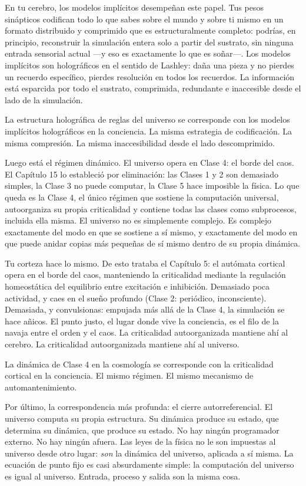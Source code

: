 \documentclass[11pt, twoside, openright]{book}
\begin{document}
En tu cerebro, los modelos implícitos desempeñan este papel. Tus pesos sinápticos codifican todo lo que sabes sobre el mundo y sobre ti mismo en un formato distribuido y comprimido que es estructuralmente completo: podrías, en principio, reconstruir la simulación entera solo a partir del sustrato, sin ninguna entrada sensorial actual ---y eso es exactamente lo que es soñar---. Los modelos implícitos son holográficos en el sentido de Lashley: daña una pieza y no pierdes un recuerdo específico, pierdes resolución en todos los recuerdos. La información está esparcida por todo el sustrato, comprimida, redundante e inaccesible desde el lado de la simulación.

La estructura holográfica de reglas del universo se corresponde con los modelos implícitos holográficos en la conciencia. La misma estrategia de codificación. La misma compresión. La misma inaccesibilidad desde el lado descomprimido.

Luego está el régimen dinámico. El universo opera en Clase 4: el borde del caos. El Capítulo 15 lo estableció por eliminación: las Clases 1 y 2 son demasiado simples, la Clase 3 no puede computar, la Clase 5 hace imposible la física. Lo que queda es la Clase 4, el único régimen que sostiene la computación universal, autoorganiza su propia criticalidad y contiene todas las clases como subprocesos, incluida ella misma. El universo no es simplemente complejo. Es complejo exactamente del modo en que se sostiene a sí mismo, y exactamente del modo en que puede anidar copias más pequeñas de sí mismo dentro de su propia dinámica.

Tu corteza hace lo mismo. De esto trataba el Capítulo 5: el autómata cortical opera en el borde del caos, manteniendo la criticalidad mediante la regulación homeostática del equilibrio entre excitación e inhibición. Demasiado poca actividad, y caes en el sueño profundo (Clase 2: periódico, inconsciente). Demasiada, y convulsionas: empujada más allá de la Clase 4, la simulación se hace añicos. El punto justo, el lugar donde vive la conciencia, es el filo de la navaja entre el orden y el caos. La criticalidad autoorganizada mantiene ahí al cerebro. La criticalidad autoorganizada mantiene ahí al universo.

La dinámica de Clase 4 en la cosmología se corresponde con la criticalidad cortical en la conciencia. El mismo régimen. El mismo mecanismo de automantenimiento.

Por último, la correspondencia más profunda: el cierre autorreferencial. El universo computa su propia estructura. Su dinámica produce su estado, que determina su dinámica, que produce su estado. No hay ningún programador externo. No hay ningún afuera. Las leyes de la física no le son impuestas al universo desde otro lugar: \textit{son} la dinámica del universo, aplicada a sí misma. La ecuación de punto fijo es casi absurdamente simple: la computación del universo es igual al universo. Entrada, proceso y salida son la misma cosa.
\end{document}
